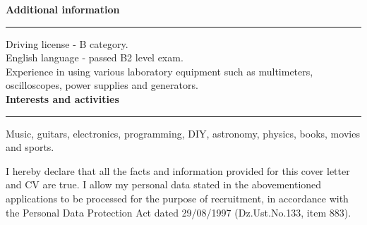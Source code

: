\documentclass{article}
\newcommand{\header}[1] 
{
	\textbf{\large #1}
	\vspace{0.005\textheight}
	\hrule 
	\vspace{0.005\textheight}
}
\begin{document}

\header{Additional information}
Driving license - B category.\\
English language - passed B2 level exam.\\
Experience in using various laboratory equipment such as multimeters, oscilloscopes, power supplies and generators.\\
\header{Interests and activities}
Music, guitars, electronics, programming, DIY, astronomy, physics, books, movies and sports.
\vspace{0.05\textheight}
\noindent\newline
\scriptsize
\begin{minipage}{\textwidth}
	I hereby declare that all the facts and information provided for this cover letter and CV are true. I allow my personal data stated in the abovementioned applications to be processed for the purpose of recruitment, in accordance with the Personal Data Protection Act dated 29/08/1997 (Dz.Ust.No.133, item 883).
\end{minipage}
\end{document}
